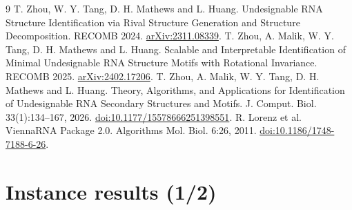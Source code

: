 \documentclass[10pt,a4paper]{article}
\begin{document}
\begin{thebibliography}{9}\small
{} T. Zhou, W. Y. Tang, D. H. Mathews and L. Huang.
Undesignable RNA Structure Identification via Rival Structure Generation and Structure Decomposition. RECOMB 2024. \href{https://arxiv.org/abs/2311.08339}{arXiv:2311.08339}.
 T. Zhou, A. Malik, W. Y. Tang, D. H. Mathews and L. Huang.
Scalable and Interpretable Identification of Minimal Undesignable RNA Structure Motifs with Rotational Invariance. RECOMB 2025. \href{https://arxiv.org/abs/2402.17206}{arXiv:2402.17206}.
 T. Zhou, A. Malik, W. Y. Tang, D. H. Mathews and L. Huang.
Theory, Algorithms, and Applications for Identification of Undesignable RNA Secondary Structures and Motifs. J. Comput. Biol. 33(1):134--167, 2026. \href{https://doi.org/10.1177/15578666251398551}{doi:10.1177/15578666251398551}.
 R. Lorenz et al. ViennaRNA Package 2.0. Algorithms Mol. Biol. 6:26, 2011. \href{https://doi.org/10.1186/1748-7188-6-26}{doi:10.1186/1748-7188-6-26}.
\end{thebibliography}
\newpage\section*{Instance results (1/2)}
\end{document}
